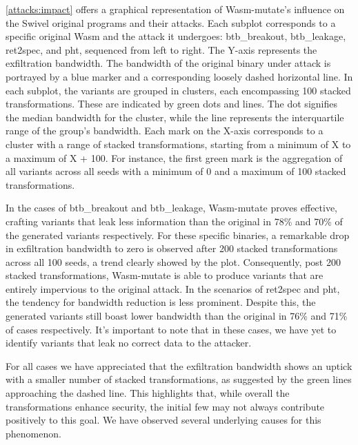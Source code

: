 \documentclass[sigplan,screen]{acmart}
\newcommand{\tool}{Wasm-mutate\xspace}
\newcommand{\wasm}{Wasm\xspace}
\begin{document}
\autoref{attacks:impact} offers a graphical representation of \tool's influence on the Swivel original programs and their attacks. 
Each subplot corresponds to a specific original \wasm and the attack it undergoes: btb\_breakout, btb\_leakage, ret2spec, and pht, sequenced from left to right.
The Y-axis represents the exfiltration bandwidth. 
The bandwidth of the original binary under attack is portrayed by a blue marker and a corresponding loosely dashed horizontal line.
In each subplot, the variants are grouped in clusters, each encompassing 100 stacked transformations. 
These are indicated by green dots and lines. 
The dot signifies the median bandwidth for the cluster, while the line represents the interquartile range of the group's bandwidth.
Each mark on the X-axis corresponds to a cluster with a range of stacked transformations, starting from a minimum of X to a maximum of X + 100. 
For instance, the first green mark is the aggregation of all variants across all seeds with a minimum of 0 and a maximum of 100 stacked transformations.


In the cases of btb\_breakout and btb\_leakage, \tool proves effective, crafting variants that leak less information than the original in 78\% and 70\% of the generated variants respectively. 
For these specific binaries, a remarkable drop in exfiltration bandwidth to zero is observed after 200 stacked transformations across all 100 seeds, a trend clearly showed by the plot. 
Consequently, post 200 stacked transformations, \tool is able to produce variants that are entirely impervious to the original attack.
In the scenarios of ret2spec and pht, the tendency for bandwidth reduction is less prominent. 
Despite this, the generated variants still boast lower bandwidth than the original in 76\% and 71\% of cases respectively. 
It's important to note that in these cases, we have yet to identify variants that leak no correct data to the attacker.


For all cases we have appreciated that the exfiltration bandwidth shows an uptick with a smaller number of stacked transformations, as suggested by the green lines approaching the dashed line. 
This highlights that, while overall the transformations enhance security, the initial few may not always contribute positively to this goal.
We have observed several underlying causes for this phenomenon.
\end{document}
